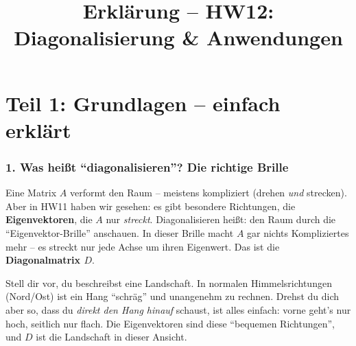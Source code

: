 \documentclass[a4paper,12pt]{article}
\title{Erkl\"arung -- HW12: Diagonalisierung \& Anwendungen}
\author{}
\date{}
\begin{document}
\maketitle

\part*{Teil 1: Grundlagen -- einfach erkl\"art}

\section*{1. Was hei\ss t ``diagonalisieren''? Die richtige Brille}

Eine Matrix $A$ verformt den Raum -- meistens kompliziert (drehen \emph{und} strecken). Aber in HW11 haben wir gesehen: es gibt besondere Richtungen, die \textbf{Eigenvektoren}, die $A$ nur \emph{streckt}. Diagonalisieren hei\ss t: den Raum durch die ``Eigenvektor-Brille'' anschauen. In dieser Brille macht $A$ gar nichts Kompliziertes mehr -- es streckt nur jede Achse um ihren Eigenwert. Das ist die \textbf{Diagonalmatrix $D$}.

\begin{center}
\end{center}

\begin{analogie}
Stell dir vor, du beschreibst eine Landschaft. In normalen Himmelsrichtungen (Nord/Ost) ist ein Hang ``schr\"ag'' und unangenehm zu rechnen. Drehst du dich aber so, dass du \emph{direkt den Hang hinauf} schaust, ist alles einfach: vorne geht's nur hoch, seitlich nur flach. Die Eigenvektoren sind diese ``bequemen Richtungen'', und $D$ ist die Landschaft in dieser Ansicht.
\end{analogie}
\end{document}
